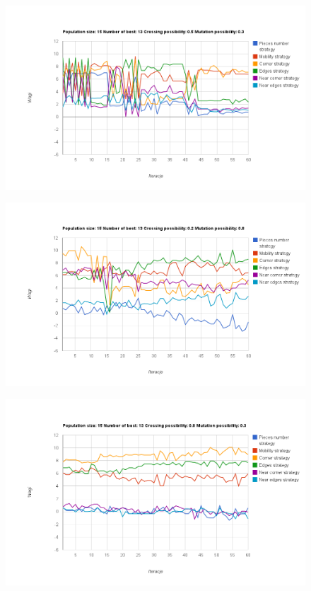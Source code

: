 \begin{figure}[h!]
\centering
\includegraphics[width=\textwidth]{img/chart6.png}
\end{figure}

\pagebreak

\begin{figure}[h!]
\centering
\includegraphics[width=\textwidth]{img/chart7.png}
\end{figure}

\begin{figure}[h!]
\centering
\includegraphics[width=\textwidth]{img/chart8.png}
\end{figure}

